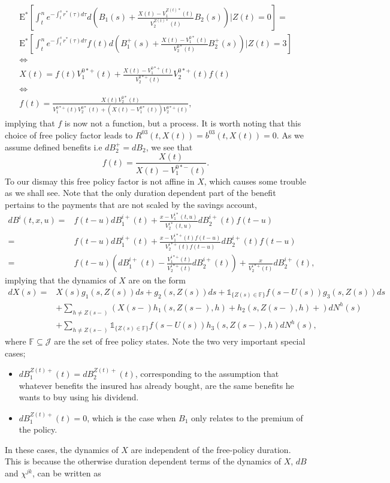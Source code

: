\documentclass[12pt]{article}
\newcommand{\E}{\text{E}}
\newcommand{\indic}[1]{\mathds{1}_{ \{ #1 \} }}
\theoremstyle{my_thm}
\begin{document}
\begin{gather*}
\E^* \left[ \int_t^n e^{-\int_t^s r^*(\tau) d\tau} d \left( B_1(s)+\frac{X(t)-V_1^{Z(t)*}(t)}{V_2^{Z(t)*}(t)}B_2(s) \right) |Z(t)=0 \right]
=
\\
\E^* \left[ \int_t^n e^{-\int_t^s r^*(\tau) d\tau} f(t) d \left( B_1^+(s)+\frac{X(t)-V_1^{0*}(t)}{V_2^{0*}(t)}B_2^+(s) \right) |Z(t)=3 \right]
\\
\Leftrightarrow
\\
X(t)
=
f(t)V_1^{0*+}(t)+ \frac{X(t)-V_1^{0*+}(t)}{V_2^{0*+}(t)}V_2^{0*+}(t)f(t)
\\
\Leftrightarrow
\\
f(t)=\frac{X(t)V_2^{0*}(t)}{V_1^{0*+}(t)V_2^{0*}(t)+(X(t)-V_1^{0*}(t))V_2^{0*+}(t)},
\end{gather*}
implying that $f$ is now not a function, but a process. It is worth noting that this choice of free policy factor leads to $R^{03}(t,X(t))=b^{03}(t,X(t))=0$. As we assume defined benefits i.e $dB_2^+=dB_2$, we see that
$$
f(t)=\frac{X(t)}{X(t)-V_1^{0*-}(t)}.
$$
To our dismay this free policy factor is not affine in $X$, which causes some trouble as we shall see. Note that the only duration dependent part of the benefit pertains to the payments that are not scaled by the savings account,
\begin{align*}
dB^i(t,x,u)=&f(t-u)dB^{i+}_1(t)+\frac{x-V_1^{i*}(t,u)}{V_2^{i*}(t,u)}dB_2^{i+}(t)f(t-u)
\\
=&
f(t-u)dB^{i+}_1(t)+\frac{x-V_1^{i*+}(t)f(t-u)}{V_2^{i*+}(t)f(t-u)}dB_2^{i+}(t)f(t-u)
\\
=&
f(t-u)\left( dB^{i+}_1(t) - \frac{V_1^{i*+}(t)}{V_2^{i*+}(t)}dB_2^{i+}(t) \right)  +\frac{x}{V_2^{i*+}(t)}dB_2^{i+}(t),
\end{align*}
implying that the dynamics of $X$ are on the form
\begin{align}
dX(s)=&X(s)g_1(s,Z(s))ds+g_2(s,Z(s))ds +  \indic{Z(s)\in \mathbb{F}} f(s-U(s)) g_3(s,Z(s))ds \label{eq:AAK} \\
&+
\sum_{h\neq Z(s-)} \left( X(s-)h_1(s,Z(s-),h)+ h_2(s,Z(s-),h) + \right) dN^h(s)
\nonumber \\
&+
\sum_{h\neq Z(s-)}  \indic{Z(s)\in \mathbb{F}} f(s-U(s))h_3(s,Z(s-),h) dN^h(s),
\nonumber
\end{align}
where $\mathbb{F} \subseteq \mathcal{J}$ are the set of free policy states. Note the two very important special cases;
\begin{itemize}
\item $dB_1^{Z(t)+}(t)=dB_2^{Z(t)+}(t)$, corresponding to the assumption that whatever benefits the insured has already bought, are the same benefits he wants to buy using his dividend.
\item $dB_1^{Z(t)+}(t)=0$, which is the case when $B_1$ only relates to the premium of the policy. 
\end{itemize}  In these cases, the dynamics of $X$ are independent of the free-policy duration. This is because the otherwise duration dependent terms of the dynamics of $X$, $dB$ and $\chi^{jk}$, can be written as
\end{document}
